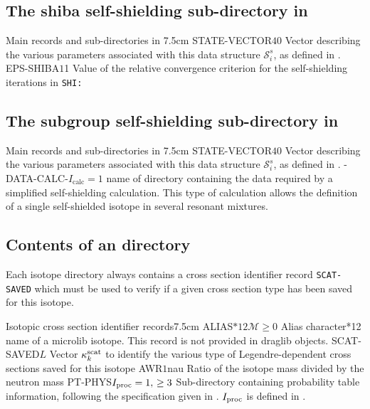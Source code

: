 \clearpage

\subsection{The {\sc shiba} self-shielding sub-directory  in
}\label{sect:shibadirselfshield}

\begin{DescriptionEnregistrement}{Main records and sub-directories in }{7.5cm}
\IntEnr
  {STATE-VECTOR}{$40$}
  {Vector describing the various parameters associated with this data structure $\mathcal{S}^{s}_{i}$,
  as defined in .}
\RealEnr
  {EPS-SHIBA}{$1$}{1}
  {Value of the relative convergence criterion for the self-shielding iterations in {\tt SHI:} }
\end{DescriptionEnregistrement}

\subsection{The subgroup self-shielding sub-directory  in
}\label{sect:subgroupdirselfshield}

\begin{DescriptionEnregistrement}{Main records and sub-directories in }{7.5cm}
\IntEnr
  {STATE-VECTOR}{$40$}
  {Vector describing the various parameters associated with this data structure $\mathcal{S}^{s}_{i}$,
  as defined in .}
\OptDirEnr
  {-DATA-CALC-}{$I_{\mathrm{calc}} = 1$}
  {name of directory containing the data required by a simplified self-shielding
  calculation. This type of calculation allows the definition of a single
  self-shielded isotope in several resonant mixtures.}
\end{DescriptionEnregistrement}

\subsection{Contents of an  directory}\label{sect:isotopedir}

Each isotope directory always contains a cross section identifier record {\tt SCAT-SAVED}
which must be used to verify if a given cross section type has
been saved for this isotope.

\begin{DescriptionEnregistrement}{Isotopic cross section identifier
records}{7.5cm}
\label{tabl:tabiso1}
\OptCharEnr
  {ALIAS}{$*12$}{$\mathcal{M} \ge 0$}
  {Alias character*12 name of a microlib isotope. This record is not provided in {\sc draglib} objects.}
\IntEnr
  {SCAT-SAVED}{$L$}
  {Vector $\kappa^{\rm scat}_{k}$ to identify the various type of
   Legendre-dependent cross sections saved for this isotope}
\RealEnr
  {AWR}{$1$}{nau}
  {Ratio of the isotope mass divided by the neutron mass}
\OptDirEnr
  {PT-PHYS}{$I_{\rm proc}=1, \, \ge 3$}
  {Sub-directory containing probability table information, following the specification given in .
  $I_{\rm proc}$ is defined in .}
\end{DescriptionEnregistrement}

